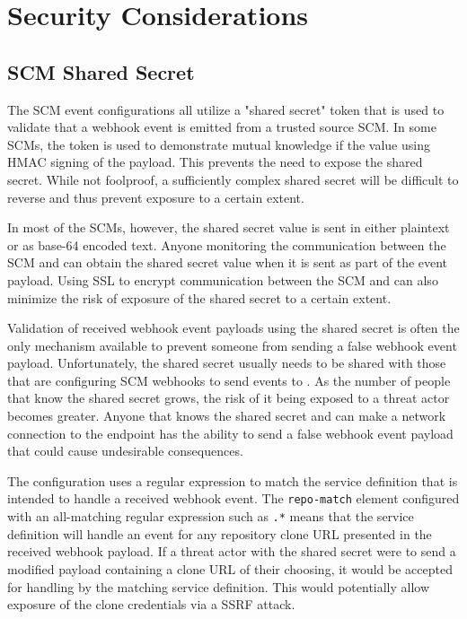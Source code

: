 \chapter{\cxoneflowtext\space Security Considerations}\label{sec:cxoneflow-security}


\section{SCM Shared Secret}

The SCM event configurations all utilize a "shared secret" token that is used to validate that
a webhook event is emitted from a trusted source SCM.  In some SCMs, the token is used to
demonstrate mutual knowledge if the value using HMAC signing of the payload.  This prevents
the need to expose the shared secret.  While not foolproof, a sufficiently complex shared
secret will be difficult to reverse and thus prevent exposure to a certain extent.

In most of the SCMs, however, the shared secret value is sent in either plaintext or as base-64 
encoded text.  Anyone monitoring the communication between the SCM and \cxoneflow can obtain
the shared secret value when it is sent as part of the event payload.  Using SSL to encrypt
communication between the SCM and \cxoneflow can also minimize the risk of exposure
of the shared secret to a certain extent.

Validation of received webhook event payloads using the shared secret is often the only mechanism
available to prevent someone from sending a false webhook event payload.
Unfortunately, the shared secret usually needs to be shared with those that are configuring
SCM webhooks to send events to \cxoneflowns.  As the number of people that know the shared secret
grows, the risk of it being exposed to a threat actor becomes greater.  Anyone that knows
the shared secret and can make a network connection to the \cxoneflow endpoint has the ability
to send a false webhook event payload that could cause undesirable consequences.

The \cxoneflow configuration uses a regular expression to match the service definition
that is intended to handle a received webhook event.  The \texttt{repo-match} element
configured with an all-matching regular expression such as \texttt{.*} means that the
service definition will handle an event for any repository clone URL presented in the
received webhook payload.  If a threat actor with the shared secret were to send a modified payload
containing a clone URL of their choosing, it would be accepted for handling by
the matching service definition.  This would potentially allow exposure of the
clone credentials via a SSRF attack.

